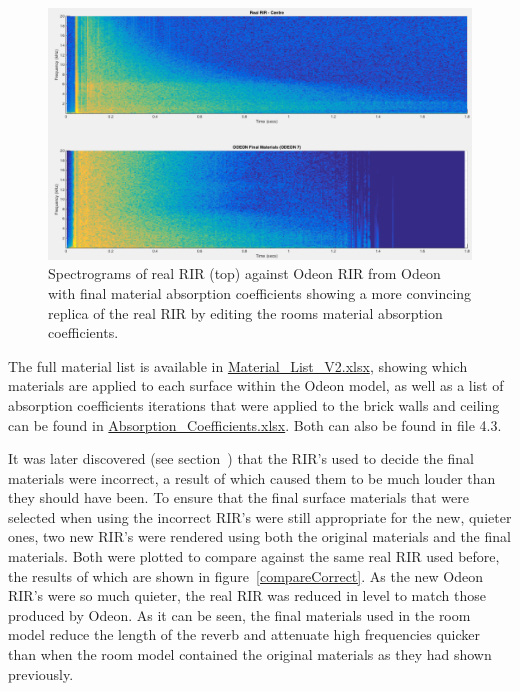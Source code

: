 \documentclass[../../main.tex]{subfiles}
\begin{document}
			\begin{figure}[H]
				\centerline{\includegraphics[scale = 0.4]{Sections/Implementation/Odeon/images/MaterialCompare/OriginalMaterials/new.png}}
				\caption{Spectrograms of real \ac{RIR} (top) against Odeon \ac{RIR} from Odeon with final material absorption coefficients showing a more convincing replica of the real \ac{RIR} by editing the rooms material absorption coefficients.}
				\label{compareNew}
			\end{figure}

			The full material list is available in \href{http://lt669.github.io/pages/Material_List_Final.htm}{Material\_List\_V2.xlsx}, showing which materials are applied to each surface within the Odeon model, as well as a list of absorption coefficients iterations that were applied to the brick walls and ceiling can be found in \href{http://lt669.github.io/pages/Absorption%20Coefficients.htm}{Absorption\_Coefficients.xlsx}. Both can also be found in file 4.3.

			It was later discovered (see section~) that the \ac{RIR}'s used to decide the final materials were incorrect, a result of which caused them to be much louder than they should have been. To ensure that the final surface materials that were selected when using the incorrect \ac{RIR}'s were still appropriate for the new, quieter ones, two new \ac{RIR}'s were rendered using both the original materials and the final materials. Both were plotted to compare against the same real \ac{RIR} used before, the results of which are shown in figure~\ref{compareCorrect}. As the new Odeon \ac{RIR}'s were so much quieter, the real \ac{RIR} was reduced in level to match those produced by Odeon. As it can be seen, the final materials used in the room model reduce the length of the reverb and attenuate high frequencies quicker than when the room model contained the original materials as they had shown previously.  
\end{document}
